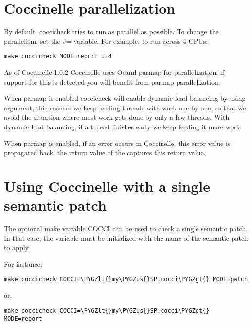 \documentclass[a4paper,8pt,english]{sphinxmanual}
\def\PYGZus{\char`\_}
\def\PYGZlt{\char`\<}
\def\PYGZgt{\char`\>}
\begin{document}
\section{Coccinelle parallelization}
\label{dev-tools/coccinelle:coccinelle-parallelization}
By default, coccicheck tries to run as parallel as possible. To change
the parallelism, set the J= variable. For example, to run across 4 CPUs:

\begin{Verbatim}[commandchars=\\\{\}]
make coccicheck MODE=report J=4
\end{Verbatim}

As of Coccinelle 1.0.2 Coccinelle uses Ocaml parmap for parallelization,
if support for this is detected you will benefit from parmap parallelization.

When parmap is enabled coccicheck will enable dynamic load balancing by using
 argument, this ensures we keep feeding threads with work
one by one, so that we avoid the situation where most work gets done by only
a few threads. With dynamic load balancing, if a thread finishes early we keep
feeding it more work.

When parmap is enabled, if an error occurs in Coccinelle, this error
value is propagated back, the return value of the 
captures this return value.


\section{Using Coccinelle with a single semantic patch}
\label{dev-tools/coccinelle:using-coccinelle-with-a-single-semantic-patch}
The optional make variable COCCI can be used to check a single
semantic patch. In that case, the variable must be initialized with
the name of the semantic patch to apply.

For instance:

\begin{Verbatim}[commandchars=\\\{\}]
make coccicheck COCCI=\PYGZlt{}my\PYGZus{}SP.cocci\PYGZgt{} MODE=patch
\end{Verbatim}

or:

\begin{Verbatim}[commandchars=\\\{\}]
make coccicheck COCCI=\PYGZlt{}my\PYGZus{}SP.cocci\PYGZgt{} MODE=report
\end{Verbatim}
\end{document}
